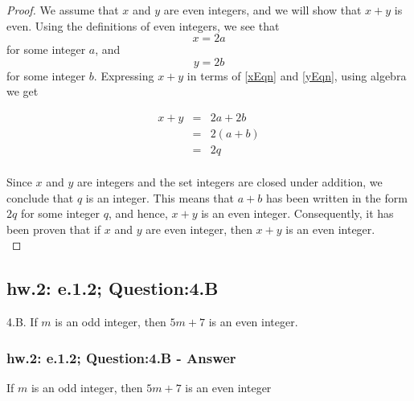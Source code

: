 \begin{proof}
We assume that $x$ and $y$ are even integers, and we will show that $x+y$ is even. Using the definitions of even integers, we see that
	\begin{equation}
		\label{xEqn}
			x = 2a
	\end{equation}
for some integer $a$, and
	\begin{equation}
		\label{yEqn}
			y = 2b
	\end{equation}
for some integer $b$. Expressing $x+y$ in terms of \ref{xEqn} and \ref{yEqn}, using algebra we get

\begin{eqnarray*}
	x + y & = & 2a + 2b \nonumber \\
	& = & 2(a+b) \nonumber \\
	& = & 2q \nonumber \\
\end{eqnarray*}

Since $x$ and $y$ are integers and the set integers are closed under addition, we conclude that $q$ is an integer. This means that $a + b$ has been written in the form $2q$ for some integer $q$, and hence, $x + y$ is an even integer. Consequently, it has been proven that if $x$ and $y$ are even integer, then $x + y$ is an even integer. \\
\end{proof}


\subsection{hw.2: e.1.2; Question:4.B} 
4.B. If $m$ is an odd integer, then $5m + 7$ is an even integer. \\

\subsubsection*{hw.2: e.1.2; Question:4.B - Answer} 
\begin{tcolorbox}
\begin{theorem}
If $m$ is an odd integer, then $5m + 7$ is an even integer
\end{theorem}
\end{tcolorbox}

